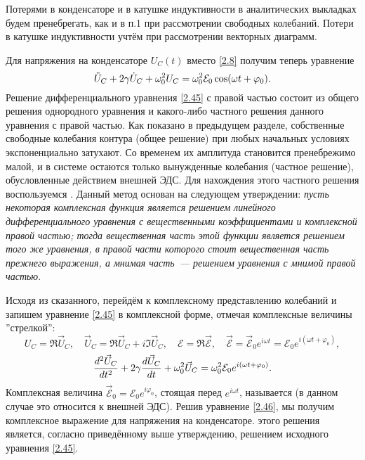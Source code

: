 Потерями в конденсаторе и в катушке индуктивности в аналитических выкладках
будем пренебрегать, как и в п.1 при рассмотрении свободных колебаний. Потери в
катушке индуктивности учтём при рассмотрении векторных диаграмм.

Для напряжения на конденсаторе $U_C(t)$ вместо \eqref{2.8} получим теперь
уравнение
\begin{equation}\eqmark{2.45}
\ddot{U}_C+2\gamma \dot{U}_C+\omega_0^2U_C=\omega_0^2\mathcal{E}_0\cos(\omega t+
\varphi_0).
\end{equation}
Решение  дифференциального уравнения \eqref{2.45} с правой
частью состоит из общего решения однородного уравнения и какого-либо частного
решения данного уравнения с правой частью. Как показано в предыдущем разделе,
собственные свободные колебания контура (общее решение) при любых начальных
условиях экспоненциально затухают. Со временем их амплитуда становится
пренебрежимо малой, и в системе остаются только вынужденные колебания (частное
решение), обусловленные действием внешней ЭДС. Для нахождения этого частного
решения воспользуемся . Данный метод
основан на следующем утверждении: \emph{пусть некоторая комплексная функция
является решением линейного дифференциального уравнения с вещественными
коэффициентами и комплексной правой частью; тогда вещественная часть этой
функции является решением того же уравнения, в правой части которого стоит
вещественная часть прежнего выражения, а мнимая часть~--- решением уравнения с
мнимой правой частью}.

Исходя из сказанного, перейдём к комплексному представлению колебаний и запишем
уравнение \eqref{2.45} в комплексной форме, отмечая комплексные величины
''стрелкой'':
\begin{equation*}
U_C=\Re \vec U_C, \quad \vec U_C=\Re \vec U_C+i\Im \vec U_C, \quad
\mathcal{E}=\Re \vec{\mathcal{E}}, \quad \vec{\mathcal{E}}=
\vec{\mathcal{E}}_0e^{i\omega t}=\mathcal{E}_0e^{i(\omega t+\varphi_0)},
\end{equation*}
\begin{equation}\eqmark{2.46}
\dfrac{d^2\vec U_C}{dt^2}+2\gamma\dfrac{d\vec U_C}{dt}+\omega_0^2\vec
U_C=\omega_0^2\mathcal{E}_0e^{i(\omega t+\varphi_0)}.
\end{equation}
Комплексная величина $\vec{\mathcal{E}}_0=\mathcal{E}_0e^{i\varphi_0}$, стоящая
перед $e^{i\omega t}$, называется  (в данном
случае это относится к внешней ЭДС). Решив уравнение \eqref{2.46}, мы получим
комплексное выражение для напряжения на конденсаторе.  этого решения является, согласно приведённому выше утверждению, решением
исходного уравнения \eqref{2.45}.

